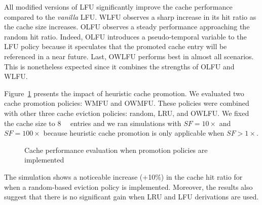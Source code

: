 All modified versions of LFU significantly improve the cache performance compared to the \textit{vanilla} LFU.
WLFU observes a sharp increase in its hit ratio as the cache size increases.
OLFU observes a steady performance approaching the random hit ratio.
Indeed, OLFU introduces a pseudo-temporal variable to the LFU policy because it speculates that the promoted cache entry will be referenced in a near future. 
Last, OWLFU performs best in almost all scenarios.
This is nonetheless expected since it combines the strengths of OLFU and WLFU.

Figure~\ref{fig:promo_fig} presents the impact of heuristic cache promotion. 
We evaluated two cache promotion policies: WMFU and OWMFU. These policies were combined with other three cache eviction policies: random, LRU, and OWLFU.
We fixed the cache size to \SI{8}{\kilo\nothing} entries and we ran simulations with $SF=10\times$ and $SF=100\times$ because heuristic cache promotion is only applicable when $SF>1\times$.

\begin{figure}[]
	\centering
	\qquad
	\caption{Cache performance evaluation when promotion policies are implemented}
	\label{fig:promo_fig}
\end{figure}

The simulation shows a noticeable increase (+10\%) in the cache hit ratio for when a random-based eviction policy is implemented.
Moreover, the results also suggest that there is no significant gain when LRU and LFU derivations are used.

